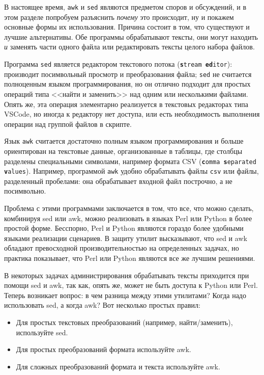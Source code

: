 \documentclass[a4paper,12pt,final,openany]{extbook}
\providecommand{\tightlist}{%
  \setlength{\itemsep}{0pt}\setlength{\parskip}{0pt}}
\begin{document}
В настоящее время, \texttt{awk} и \texttt{sed} являются предметом споров
и обсуждений, и в этом разделе попробуем разъяснить \emph{почему} это
происходит, ну и покажем основные формы их использования. Причина
состоит в том, что существуют и лучшие альтернативы. Обе
программы обрабатывают тексты, они могут находить \emph{и} заменять
части одного файла или редактировать тексты целого набора файлов.

Программа \texttt{sed} является редактором текстового потока (\texttt{\textbf{s}tream \textbf{ed}itor}):
производит посимвольный просмотр и преобразования файла; \texttt{sed} не считается полноценным
языком программирования, но он отлично подходит для простых операций типа
<<найти и заменить>> над одним или несколькими файлами. Опять же, эта
операция элементарно реализуется в текстовых редакторах типа VSCode, но
иногда к редактору нет доступа, или есть необходимость выполнения
операции над группой файлов в скрипте.

Язык \texttt{awk} считается достаточно полным языком программирования и больше ориентирован на текстовые данные, организованные в таблицы, где
столбцы разделены специальными символами, например формата CSV (\texttt{\textbf{c}omma
\textbf{s}eparated \textbf{v}alues}). Например, программой \texttt{awk} удобно обрабатывать файлы \texttt{csv} или
файлы, разделенный пробелами: она обрабатывает входной файл
построчно, а не посимвольно.

Проблема с этими программами заключается в том, что все, что можно
сделать, комбинируя sed или awk, можно реализовать в языках Perl или
Python в более простой форме. Бесспорно, Perl и Python являются гораздо более
удобными языками реализации сценариев. В защиту утилит высказывают, что
sed и awk обладают превосходной производительностью на определенных задачах, но практика показывает, что Perl или Python являются все же лучшим
решениями.

В некоторых задачах администрирования обрабатывать тексты
приходится при помощи sed и awk, так как, опять же, может не быть
доступа к Python или Perl. Теперь возникает вопрос: в чем разница между
этими утилитами? Когда надо использовать sed, а когда awk? Вот несколько
простых правил:

\begin{itemize}
\tightlist
\item
  Для простых текстовых преобразований (например, найти/заменить),
  используйте sed.
\item
  Для простых преобразований формата используйте awk.
\item
  Для сложных преобразований формата и текста используйте awk.
\end{itemize}
\end{document}
